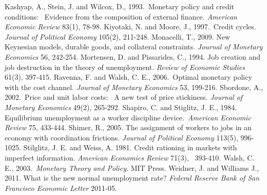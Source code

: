 \documentclass{article}
\begin{document}
Kashyap, A., Stein, J. and Wilcox, D., 1993.\ Monetary policy and credit
conditions: \ Evidence from the composition of external finance. \textit{%
American Economic Review }83(1), 78-98.\bigskip \newline
Kiyotaki, N. and Moore, J., 1997.\ Credit cycles. \textit{Journal of
Political Economy} 105(2), 211-248.\bigskip \newline
Monacelli, T., 2009. New Keynesian models, durable goods, and collateral
constraints. \textit{Journal of Monetary Economics} 56, 242-254.\bigskip
\newline
Mortensen, D. and Pissarides, C., 1994. Job creation and job destruction in
the theory of unemployment. \textit{Review of Economic Studies} 61(3),
397-415.\bigskip \newline
Ravenna, F. and Walsh, C. E., 2006.\ Optimal monetary policy with the cost
channel. \textit{Journal of Monetary Economics} 53, 199-216.\bigskip \newline
Sbordone, A., 2002.\ Price and unit labor costs: \ A new test of price
stickiness. \textit{Journal of Monetary Economics} 49(2), 265-292.\bigskip
\newline
Shapiro, C. and Stiglitz, J. E., 1984. Equilibrium unemployment as a worker
discipline device.\ \textit{American Economic Review} 75, 433-444.\bigskip
\newline
Shimer, R., 2005. The assignment of workers to jobs in an economy with
coordination frictions. \textit{Journal of Political Economy} 113(5),
996-1025.\bigskip \newline
Stilglitz, J. E. and Weiss, A. 1981. Credit rationing in markets with
imperfect information. \textit{American Economics Review }71(3),\textit{\ }%
393-410\textit{.}\bigskip \newline
Walsh, C. E., 2003.\ \textit{Monetary Theory and Policy}. MIT Press.\bigskip
\newline
Weidner, J. and Williams J., 2011. What is the new normal unemployment rate?
\textit{Federal Reserve Bank of San Francisco Economic Letter }2011-05.
\end{document}
